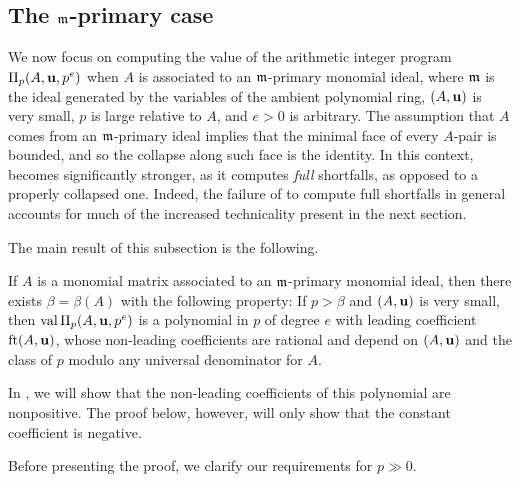 \documentclass[11pt]{amsart}
\begin{document}
\subsection{The $\mathfrak{m}$-primary case}
\label{m-primary: SS}
We now focus on computing the value of the arithmetic integer program $\Pi_p(A,\mathbf{u}, p^e)$ when $A$ is associated to an $\mathfrak{m}$-primary monomial ideal, where $\mathfrak{m}$ is the ideal generated by the variables of the ambient polynomial ring, $(A,\mathbf{u})$ is very small, $p$ is large relative to $A$, and $e > 0$ is arbitrary.
The assumption that $A$ comes from an $\mathfrak{m}$-primary ideal implies that the minimal face of every $A$-pair is bounded, and so the collapse along such face is the identity.
In this context,  becomes significantly stronger, as it computes \emph{full} shortfalls, as opposed to a properly collapsed one.
Indeed, the failure of  to compute full shortfalls in general accounts for much of the increased technicality present in the next section.

The main result of this subsection is the following.

\begin{theorem}
   \label{m-primary AIP: T}
   If $A$ is a monomial matrix associated to an $\mathfrak{m}$-primary monomial ideal, then there exists $\beta=\beta(A)$ with the following property\textup:
   If $p > \beta$ and $(A,\mathbf{u})$ is very small, then $\operatorname{val} \Pi_p(A,\mathbf{u},p^e)$ is a polynomial in $p$ of degree $e$ with leading coefficient $\operatorname{ft}(A, \mathbf{u})$, whose non-leading coefficients are rational and depend on $(A,\mathbf{u})$ and the class of $p$ modulo any universal denominator for $A$.
\end{theorem}

\begin{remark}
   In , we will show that the non-leading coefficients of this polynomial are nonpositive.
   The proof below, however, will only show that the constant coefficient is negative.
\end{remark}

Before presenting the proof, we clarify our requirements for $p\gg 0$.
\end{document}
